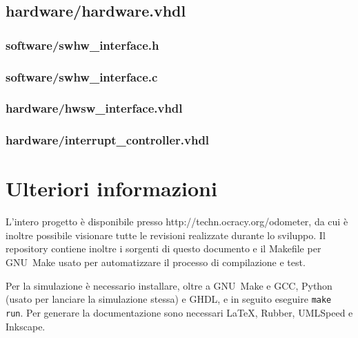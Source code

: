 \documentclass [11pt,a4paper,oneside]{article}
\newcommand{\href}[2]{#2}
\newcommand{\link}[1]{\href{#1}{#1}}
\begin{document}
\subsection{hardware/hardware.vhdl}


\subsubsection{software/swhw\_interface.h}


\subsubsection{software/swhw\_interface.c}


\subsubsection{hardware/hwsw\_interface.vhdl}


\subsubsection{hardware/interrupt\_controller.vhdl}



\section{Ulteriori informazioni}
L'intero progetto è disponibile presso \link{http://techn.ocracy.org/odometer}, da cui
è inoltre possibile visionare tutte le revisioni realizzate durante lo sviluppo.
Il repository contiene inoltre i sorgenti di questo documento e il Makefile
per GNU~Make usato per automatizzare il processo di compilazione e test.

Per la simulazione è necessario installare, oltre a GNU~Make e GCC, Python
(usato per lanciare la simulazione stessa) e GHDL, e in seguito eseguire
\texttt{make run}. Per generare la documentazione sono necessari \LaTeX,
Rubber, UMLSpeed e Inkscape.
\end{document}
